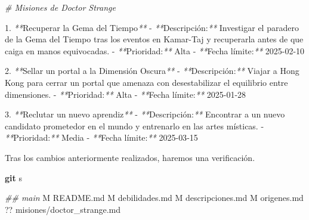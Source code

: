 \documentclass[
]{book}
\newenvironment{Shaded}{\begin{snugshade}}{\end{snugshade}}
\newcommand{\CommentTok}[1]{\textcolor[rgb]{0.56,0.35,0.01}{\textit{#1}}}
\newcommand{\ExtensionTok}[1]{#1}
\newcommand{\FunctionTok}[1]{\textcolor[rgb]{0.13,0.29,0.53}{\textbf{#1}}}
\newcommand{\NormalTok}[1]{#1}
\newcommand{\PreprocessorTok}[1]{\textcolor[rgb]{0.56,0.35,0.01}{\textit{#1}}}
\begin{document}
\begin{Shaded}
\begin{Highlighting}[]
\CommentTok{\# Misiones de Doctor Strange}

\ExtensionTok{1.} \PreprocessorTok{**}\NormalTok{Recuperar la Gema del Tiempo}\PreprocessorTok{**}
   \ExtensionTok{{-}} \PreprocessorTok{**}\NormalTok{Descripción:}\PreprocessorTok{**}\NormalTok{ Investigar el paradero de la Gema del Tiempo tras los eventos en Kamar{-}Taj y recuperarla antes de que caiga en manos equivocadas.}
   \ExtensionTok{{-}} \PreprocessorTok{**}\NormalTok{Prioridad:}\PreprocessorTok{**}\NormalTok{ Alta}
   \ExtensionTok{{-}} \PreprocessorTok{**}\NormalTok{Fecha límite:}\PreprocessorTok{**}\NormalTok{ 2025{-}02{-}10}

\ExtensionTok{2.} \PreprocessorTok{**}\NormalTok{Sellar un portal a la Dimensión Oscura}\PreprocessorTok{**}
   \ExtensionTok{{-}} \PreprocessorTok{**}\NormalTok{Descripción:}\PreprocessorTok{**}\NormalTok{ Viajar a Hong Kong para cerrar un portal que amenaza con desestabilizar el equilibrio entre dimensiones.}
   \ExtensionTok{{-}} \PreprocessorTok{**}\NormalTok{Prioridad:}\PreprocessorTok{**}\NormalTok{ Alta}
   \ExtensionTok{{-}} \PreprocessorTok{**}\NormalTok{Fecha límite:}\PreprocessorTok{**}\NormalTok{ 2025{-}01{-}28}

\ExtensionTok{3.} \PreprocessorTok{**}\NormalTok{Reclutar un nuevo aprendiz}\PreprocessorTok{**}
   \ExtensionTok{{-}} \PreprocessorTok{**}\NormalTok{Descripción:}\PreprocessorTok{**}\NormalTok{ Encontrar a un nuevo candidato prometedor en el mundo y entrenarlo en las artes místicas.}
   \ExtensionTok{{-}} \PreprocessorTok{**}\NormalTok{Prioridad:}\PreprocessorTok{**}\NormalTok{ Media}
   \ExtensionTok{{-}} \PreprocessorTok{**}\NormalTok{Fecha límite:}\PreprocessorTok{**}\NormalTok{ 2025{-}03{-}15}
\end{Highlighting}
\end{Shaded}

Tras los cambios anteriormente realizados, haremos una verificación.

\begin{Shaded}
\begin{Highlighting}[]
\FunctionTok{git}\NormalTok{ s}
\end{Highlighting}
\end{Shaded}

\begin{Shaded}
\begin{Highlighting}[]
\CommentTok{\#\# main}
 \ExtensionTok{M}\NormalTok{ README.md}
 \ExtensionTok{M}\NormalTok{ debilidades.md}
 \ExtensionTok{M}\NormalTok{ descripciones.md}
 \ExtensionTok{M}\NormalTok{ origenes.md}
\ExtensionTok{??}\NormalTok{ misiones/doctor\_strange.md}
\end{Highlighting}
\end{Shaded}
\end{document}
